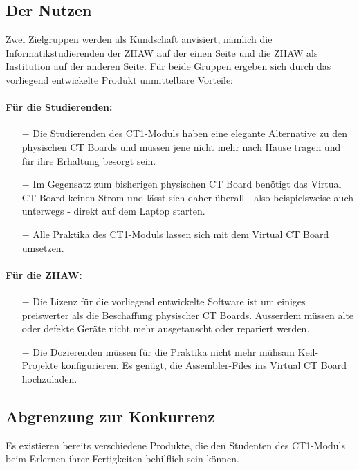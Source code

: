 \documentclass[10pt]{article}
\begin{document}
\subsection{Der Nutzen}

Zwei Zielgruppen werden als Kundschaft anvisiert, nämlich die Informatikstudierenden der ZHAW auf der einen Seite und die ZHAW als Institution auf der anderen Seite. Für beide Gruppen ergeben sich durch das vorliegend entwickelte Produkt unmittelbare Vorteile:

\paragraph{Für die Studierenden:}
\begin{itemize}
\item[$-$] Die Studierenden des CT1-Moduls haben eine elegante Alternative zu den physischen CT Boards und müssen jene nicht mehr nach Hause tragen und für ihre Erhaltung besorgt sein.
\item[$-$] Im Gegensatz zum bisherigen physischen CT Board benötigt das \glqq Virtual CT Board\grqq{} keinen Strom und lässt sich daher überall - also beispielsweise auch unterwegs - direkt auf dem Laptop starten.
\item[$-$] Alle Praktika des CT1-Moduls lassen sich mit dem \glqq Virtual CT Board\grqq{} umsetzen.
\end{itemize}

\paragraph{Für die ZHAW:}
\begin{itemize}
\item[$-$] Die Lizenz für die vorliegend entwickelte Software ist um einiges preiswerter als die Beschaffung physischer CT Boards. Ausserdem müssen alte oder defekte Geräte nicht mehr ausgetauscht oder repariert werden.
\item[$-$] Die Dozierenden müssen für die Praktika nicht mehr mühsam Keil-Projekte konfigurieren. Es genügt, die Assembler-Files ins \glqq Virtual CT Board\grqq{} hochzuladen.
\end{itemize}

\subsection{Abgrenzung zur Konkurrenz}

Es existieren bereits verschiedene Produkte, die den Studenten des CT1-Moduls beim Erlernen ihrer Fertigkeiten behilflich sein können.
\end{document}
